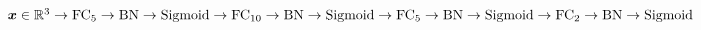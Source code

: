 $\vect{x} \in \real^3
	\newline \rightarrow \text{FC}_{5} \rightarrow \text{BN} \rightarrow \text{Sigmoid}
	\newline \rightarrow \text{FC}_{10} \rightarrow \text{BN} \rightarrow \text{Sigmoid}
	\newline \rightarrow \text{FC}_{5} \rightarrow \text{BN} \rightarrow \text{Sigmoid}
	\newline \rightarrow \text{FC}_{2} \rightarrow \text{BN} \rightarrow \text{Sigmoid}$
